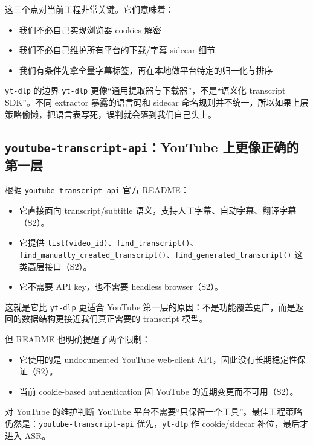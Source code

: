 \documentclass[a4paper]{article}
\begin{document}
这三个点对当前工程非常关键。它们意味着：
\begin{itemize}
\item 我们不必自己实现浏览器 cookies 解密
\item 我们不必自己维护所有平台的下载/字幕 sidecar 细节
\item 我们有条件先拿全量字幕标签，再在本地做平台特定的归一化与排序
\end{itemize}

\begin{riskbox}{\texttt{yt-dlp} 的边界}
\texttt{yt-dlp} 更像“通用提取器与下载器”，不是“语义化 transcript SDK”。不同 extractor 暴露的语言码和 sidecar 命名规则并不统一，所以如果上层策略偷懒，把语言表写死，误判就会落到我们自己头上。
\end{riskbox}

\subsection{\texttt{youtube-transcript-api}：YouTube 上更像正确的第一层}

根据 \texttt{youtube-transcript-api} 官方 README：
\begin{itemize}
\item 它直接面向 transcript/subtitle 语义，支持人工字幕、自动字幕、翻译字幕（S2）。
\item 它提供 \texttt{list(video\_id)}、\texttt{find\_transcript()}、\texttt{find\_manually\_created\_transcript()}、\texttt{find\_generated\_transcript()} 这类高层接口（S2）。
\item 它不需要 API key，也不需要 headless browser（S2）。
\end{itemize}

这就是它比 \texttt{yt-dlp} 更适合 YouTube 第一层的原因：不是功能覆盖更广，而是返回的数据结构更接近我们真正需要的 transcript 模型。

但 README 也明确提醒了两个限制：
\begin{itemize}
\item 它使用的是 undocumented YouTube web-client API，因此没有长期稳定性保证（S2）。
\item 当前 cookie-based authentication 因 YouTube 的近期变更而不可用（S2）。
\end{itemize}

\begin{findingbox}{对 YouTube 的维护判断}
YouTube 平台不需要“只保留一个工具”。最佳工程策略仍然是：\texttt{youtube-transcript-api} 优先，\texttt{yt-dlp} 作 cookie/sidecar 补位，最后才进入 ASR。
\end{findingbox}
\end{document}

